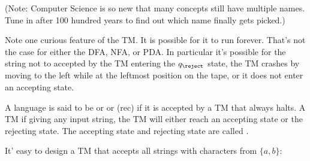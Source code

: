 (Note: 
Computer Science is so new that many concepts still have multiple names.
Tune in after 100 hundred years to find out which name finally gets picked.)

Note one curious feature of the TM. It is possible for it to run
forever. That's not the case for either the DFA, NFA, or PDA. In
particular it's possible for the string not to accepted by the TM
entering the $q_{\reject}$ state, the TM crashes by moving to the
left while at the leftmost position on the tape, or it does not
enter an accepting state.

\begin{defn}
A language is said to be
or
or
 (rec)
if it is
accepted by a TM that always halts. A TM  if
giving any input string, the TM will either reach an accepting
state or the rejecting state. The accepting state and rejecting
state are called .
\end{defn}


\newpage
\begin{eg}
It' easy to design a TM that accepts all strings with
characters from $\{a, b\}$:




\end{eg}
  
